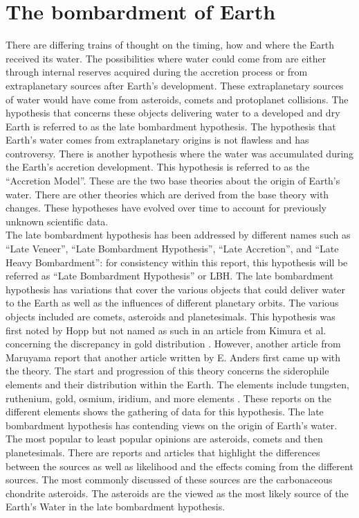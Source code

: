 
\section{\label{chap:bombardment}The bombardment of Earth}
There are differing trains of thought on the timing, how and where the Earth received its water. The possibilities where water could come from are either through internal reserves acquired during the accretion process or from extraplanetary sources after Earth’s development. These extraplanetary sources of water would have come from asteroids, comets and protoplanet collisions. The hypothesis that concerns these objects delivering water to a developed and dry Earth is referred to as the late bombardment hypothesis. The hypothesis that Earth’s water comes from extraplanetary origins is not flawless and has controversy. There is another hypothesis where the water was accumulated during the Earth’s accretion development. This hypothesis is referred to as the “Accretion Model”. These are the two base theories about the origin of Earth’s water. There are other theories which are derived from the base theory with changes. These hypotheses have evolved over time to account for previously unknown scientific data.\\

The late bombardment hypothesis has been addressed by different names such as “Late Veneer”, “Late Bombardment Hypothesis”, “Late Accretion”, and “Late Heavy Bombardment”: for consistency within this report, this hypothesis will be referred as “Late Bombardment Hypothesis” or LBH. The late bombardment hypothesis has variations that cover the various objects that could deliver water to the Earth as well as the influences of different planetary orbits. The various objects included are comets, asteroids and planetesimals. This hypothesis was first noted by Hopp\cite{BOMB1} but not named as such in an article from Kimura et al. concerning the discrepancy in gold distribution \cite{BOMB2}. However, another article from Maruyama \cite{BOMB3} report that another article written by E. Anders \cite{BOMB4} first came up with the theory. The start and progression of this theory concerns the siderophile elements and their distribution within the Earth. The elements include tungsten, ruthenium, gold, osmium, iridium, and more elements \cite{BOMB5} \cite{BOMB6} \cite{BOMB7}. These reports on the different elements shows the gathering of data for this hypothesis. The late bombardment hypothesis has contending views on the origin of Earth’s water. The most popular to least popular opinions are asteroids, comets and then planetesimals. There are reports and articles \cite{BOMB8} \cite{BOMB9} \cite{BOMB10} that highlight the differences between the sources as well as likelihood and the effects coming from the different sources. The most commonly discussed of these sources are the carbonaceous chondrite asteroids. The asteroids are the viewed as the most likely source of the Earth’s Water in the late bombardment hypothesis.\\

